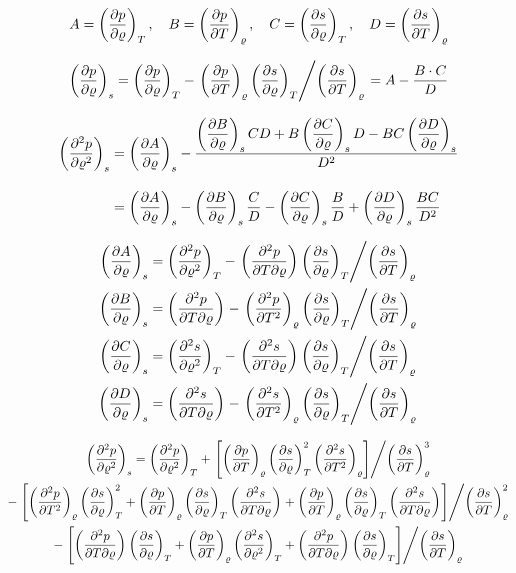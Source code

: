 \documentclass{article}
\begin{document}
\begin{equation}
A = \der{p}{\varrho}{T} ,\quad  
B  = \der{p}{T}{\varrho} ,\quad 
C  = \der{s}{\varrho}{T} ,\quad 
D  = \der{s}{T}{\varrho}
\end{equation}

\begin{equation}
\der{p}{\varrho}{s} = \der{p}{\varrho}{T}- \left. \der{p}{T}{\varrho}\der{s}{\varrho}{T} \middle/ \der{s}{T}{\varrho} \right. = A - \frac{B\cdot C}{D}
\end{equation}

\begin{align}
\der{^2p}{\varrho^2}{s} &= \der{A}{\varrho}{s} -\frac{\der{B}{\varrho}{s} C D + B \der{C}{\varrho}{s} D - B C \der{D}{\varrho}{s} }{D^2} 
\\[10pt] &= \der{A}{\varrho}{s} - \der{B}{\varrho}{s}\frac{C}{D} - \der{C}{\varrho}{s}\frac{B}{D} + \der{D}{\varrho}{s}\frac{BC}{D^2}
\end{align}

\begin{align}
\der{A}{\varrho}{s} &= \der{^2p}{\varrho^2}{T} - \left. \der{^2p}{T\partial\varrho}{} \der{s}{\varrho}{T} \middle/ \der{s}{T}{\varrho} \right. \\
\der{B}{\varrho}{s} &= \der{^2p}{T\partial\varrho}{} - \left. \der{^2p}{T^2}{\varrho} \der{s}{\varrho}{T} \middle/ \der{s}{T}{\varrho} \right. \\
\der{C}{\varrho}{s} &= \der{^2s}{\varrho^2}{T} - \left. \der{^2s}{T\partial\varrho}{} \der{s}{\varrho}{T} \middle/ \der{s}{T}{\varrho} \right. \\
\der{D}{\varrho}{s} &= \der{^2s}{T\partial\varrho}{} - \left. \der{^2s}{T^2}{\varrho} \der{s}{\varrho}{T} \middle/ \der{s}{T}{\varrho} \right. 
\end{align}

\begin{multline}
\der{^2p}{\varrho^2}{s} = \der{^2p}{\varrho^2}{T} 
+ \left. \left[ \der{p}{T}{\varrho} \der{s}{\varrho}{T}^2 \der{^2s}{T^2}{\varrho} \right] \middle/ \der{s}{T}{\varrho}^{3} \right.\\
- \left. \left[ \der{^2p}{T^2}{\varrho} \der{s}{\varrho}{T}^2 + \der{p}{T}{\varrho} \der{s}{\varrho}{T} \der{^2s}{T\partial\varrho}{} + \der{p}{T}{\varrho} \der{s}{\varrho}{T} \der{^2s}{T\partial\varrho}{} \right] \middle/ \der{s}{T}{\varrho}^{2} \right. \\
- \left. \left[ \der{^2p}{T\partial\varrho}{} \der{s}{\varrho}{T} + \der{p}{T}{\varrho} \der{^2s}{\varrho^2}{T} + \der{^2p}{T\partial\varrho}{} \der{s}{\varrho}{T} \right] \middle/ \der{s}{T}{\varrho} \right. \\
\end{multline}
\end{document}
